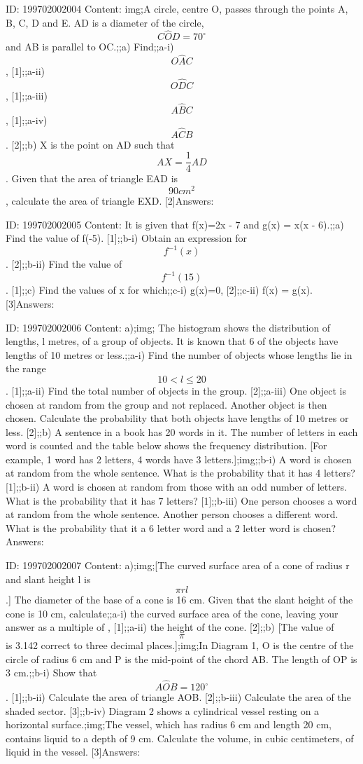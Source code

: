 \documentclass{article}
\begin{document}
ID: 199702002004
Content:
img;A circle, centre O, passes through the points A, B, C, D and E. AD is a diameter of the circle, $$C \hat OD=70^{\circ}$$ and AB is parallel to OC.;;a) Find;;a-i) $$O \hat AC$$, [1];;a-ii) $$O \hat DC$$, [1];;a-iii) $$A \hat BC$$, [1];;a-iv) $$A \hat CB$$. [2];;b) X is the point on AD such that $$AX=\frac{1}{4}AD$$. Given that the area of triangle EAD is $$90cm^2$$, calculate the area of triangle EXD. [2]Answers:

ID: 199702002005
Content:
It is given that f(x)=2x - 7 and g(x) = x(x - 6).;;a) Find the value of f(-5). [1];;b-i) Obtain an expression for $$f^{-1}(x)$$. [2];;b-ii) Find the value of $$f^{-1}(15)$$. [1];;c) Find the values of x for which;;c-i) g(x)=0, [2];;c-ii) f(x) = g(x). [3]Answers:

ID: 199702002006
Content:
a);img; The histogram shows the distribution of lengths, l metres, of a group of objects. It is 	known that 6 of the objects have lengths of 10 metres or less.;;a-i) Find the number of objects whose lengths lie in the range $$10<l\leq20$$. [1];;a-ii) Find the total number of objects in the group. [2];;a-iii) One object is chosen at random from the group and not replaced. Another object is then chosen. Calculate the probability that both objects have lengths of 10 metres or less. [2];;b) A sentence in a book has 20 words in it. The number of letters in each word is counted and the table below shows the frequency distribution. [For example, 1 word has 2 letters, 4 words have 3 letters.];img;;b-i) A word is chosen at random from the whole sentence. What is the probability that it has 4 letters? [1];;b-ii) A word is chosen at random from those with an odd number of letters. What is the probability that it has 7 letters? [1];;b-iii) One person chooses a word at random from the whole sentence. Another person chooses a different word. What is the probability that it a 6 letter word and a 2 letter word is chosen?Answers:

ID: 199702002007
Content:
a);img;[The curved surface area of a cone of radius r and slant height l is $$\pi rl$$.] The diameter of the base of a cone is 16 cm. Given that the slant height of the cone is 10 cm, calculate;;a-i) the curved surface area of the cone, leaving your answer as a multiple of \pi, [1];;a-ii) the height of the cone. [2];;b) [The value of $$\pi$$ is 3.142 correct to three decimal places.];img;In Diagram 1, O is the centre of the circle of radius 6 cm and P is the mid-point of the chord AB. The length of OP is 3 cm.;;b-i) Show that $$A \hat OB=120^{\circ}$$. [1];;b-ii) Calculate the area of triangle AOB. [2];;b-iii) Calculate the area of the shaded sector. [3];;b-iv) Diagram 2 shows a cylindrical vessel resting on a horizontal surface.;img;The vessel, which has radius 6 cm and length 20 cm, contains liquid to a depth of 9 cm. Calculate the volume, in cubic centimeters, of liquid in the vessel. [3]Answers:
\end{document}
